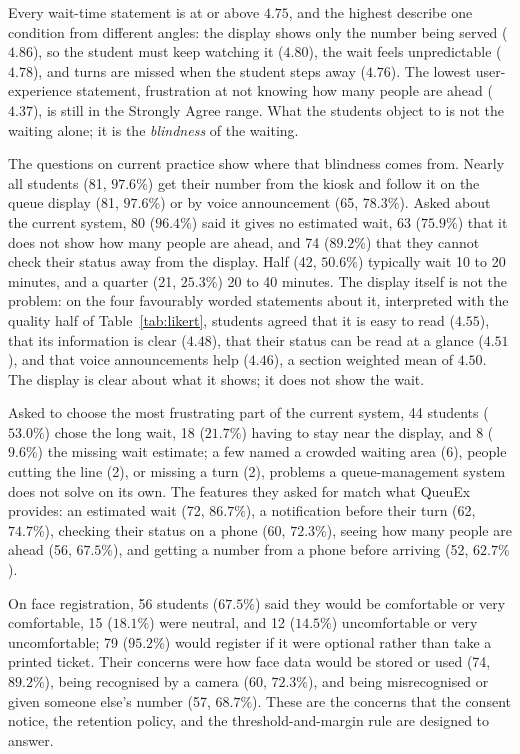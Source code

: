 \documentclass{research}
\newcommand{\sysname}{QueuEx}
\begin{document}
Every wait-time statement is at or above $4.75$, and the
highest describe one condition from different angles: the display shows
only the number being served ($4.86$), so the student must keep watching
it ($4.80$), the wait feels unpredictable ($4.78$), and turns are missed
when the student steps away ($4.76$). The lowest user-experience
statement, frustration at not knowing how many people are ahead
($4.37$), is still in the Strongly Agree range. What the students object
to is not the waiting alone; it is the \emph{blindness} of the waiting.

The questions on current practice show where that blindness comes from.
Nearly all students (81, $97.6\%$) get their number from the kiosk and
follow it on the queue display (81, $97.6\%$) or by voice announcement
(65, $78.3\%$). Asked about the current system, 80 ($96.4\%$) said it
gives no estimated wait, 63 ($75.9\%$) that it does not show how many
people are ahead, and 74 ($89.2\%$) that they cannot check their status
away from the display. Half (42, $50.6\%$) typically wait 10 to 20
minutes, and a quarter (21, $25.3\%$) 20 to 40 minutes. The display
itself is not the problem: on the four favourably worded statements
about it, interpreted with the quality half of Table~\ref{tab:likert},
students agreed that it is easy to read ($4.55$), that its information
is clear ($4.48$), that their status can be read at a glance ($4.51$),
and that voice announcements help ($4.46$), a section weighted mean of
$4.50$. The display is clear about what it shows; it does not show the
wait.

Asked to choose the most frustrating part of the current system, 44
students ($53.0\%$) chose the long wait, 18 ($21.7\%$) having to stay
near the display, and 8 ($9.6\%$) the missing wait estimate; a few named
a crowded waiting area (6), people cutting the line (2), or missing a
turn (2), problems a queue-management system does not solve on its own.
The features they asked for match what \sysname{} provides: an estimated
wait (72, $86.7\%$), a notification before their turn (62, $74.7\%$),
checking their status on a phone (60, $72.3\%$), seeing how many people
are ahead (56, $67.5\%$), and getting a number from a phone before
arriving (52, $62.7\%$).

On face registration, 56 students ($67.5\%$) said they would be
comfortable or very comfortable, 15 ($18.1\%$) were neutral, and 12
($14.5\%$) uncomfortable or very uncomfortable; 79 ($95.2\%$) would
register if it were optional rather than take a printed ticket. Their
concerns were how face data would be stored or used (74, $89.2\%$),
being recognised by a camera (60, $72.3\%$), and being misrecognised or
given someone else's number (57, $68.7\%$). These are the concerns that the
consent notice, the retention policy, and the threshold-and-margin rule
are designed to answer.
\end{document}

